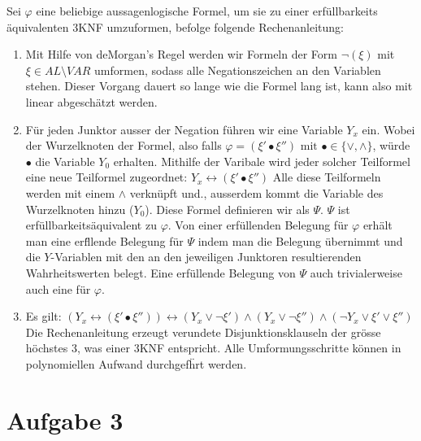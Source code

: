 \documentclass[a4paper,10pt]{article}
\begin{document}
	Sei $\varphi$ eine beliebige aussagenlogische Formel, um sie zu einer erf\"ullbarkeits
	\"aquivalenten 3KNF umzuformen, befolge folgende Rechenanleitung:
	\begin{enumerate}
		\item 	Mit Hilfe von deMorgan's Regel werden wir Formeln der Form 
			$\lnot(\xi)$ mit $\xi \in AL\setminus VAR$ umformen, sodass alle 
			Negationszeichen an den Variablen stehen. 
			Dieser Vorgang dauert so lange wie die Formel lang ist, kann also mit
			linear abgesch\"atzt werden.
		\item   F\"ur jeden Junktor ausser der Negation f\"uhren wir eine 
			Variable $Y_x$ ein. Wobei der Wurzelknoten der Formel, also falls 
			$\varphi = (\xi' \bullet \xi'') \text{ mit } \bullet \in \{\lor, \land\}$, 
			würde $\bullet$ die Variable 
			$Y_0$ erhalten. Mithilfe der Varibale wird jeder solcher Teilformel 
			eine neue Teilformel zugeordnet: 
			$Y_x \leftrightarrow (\xi' \bullet \xi'')$
			Alle diese Teilformeln werden mit einem $\land$ verkn\"upft und., 
			ausserdem kommt die Variable des Wurzelknoten hinzu ($Y_0$). Diese 
			Formel definieren wir als $\Psi$. 
			$\Psi$ ist erf\"ullbarkeits\"aquivalent zu 
			$\varphi$. Von einer erf\"ullenden Belegung f\"ur $\varphi$ erh\"alt 
			man eine erf\"llende Belegung f\"ur $\Psi$ indem man die Belegung 
			\"ubernimmt und die $Y$-Variablen mit den an den jeweiligen Junktoren 
			resultierenden Wahrheitswerten belegt. Eine erf\"ullende Belegung von 
			$\Psi$ auch trivialerweise auch eine f\"ur $\varphi$.
		\item	Es gilt: $(Y_x \leftrightarrow (\xi' \bullet \xi'')) 
			\leftrightarrow (Y_x \lor \lnot \xi') \land (Y_x \lor \lnot \xi'') 				\land (\lnot Y_x \lor \xi' \lor \xi'')$
Die Rechenanleitung erzeugt verundete Disjunktionsklauseln der gr\"osse h\"ochstes 3, was einer 3KNF entspricht. Alle Umformungsschritte k\"onnen in polynomiellen Aufwand durchgef\"hrt werden.
			
	\end{enumerate}
\section*{Aufgabe 3}
\end{document}
